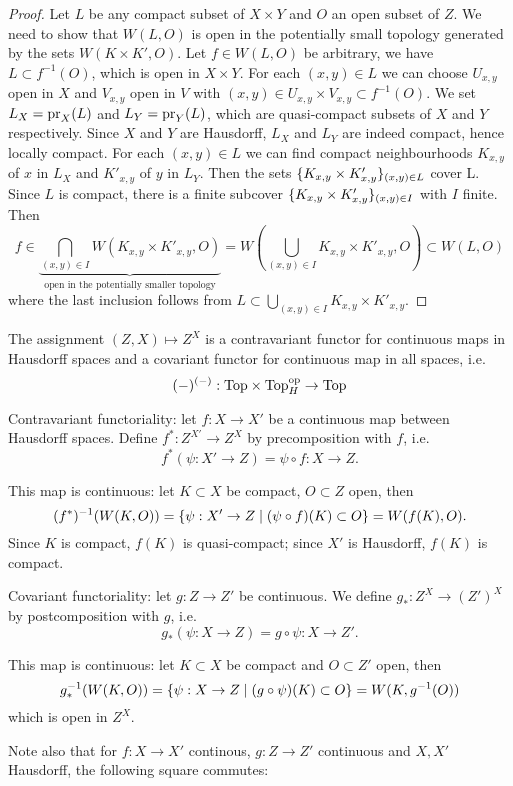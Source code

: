 \begin{proof}
Let $L$ be any compact subset of $X\times Y$ and $O$ an open subset of $Z$. We need to show that $W(L,O)$ is open in the potentially small topology generated by the sets $W(K\times K',O)$. Let $f\in W(L,O)$ be arbitrary, we have $L\subset f^{-1}(O)$, which is open in $X\times Y$. For each $(x,y)\in L$ we can choose $U_{x,y}$ open in $X$ and $V_{x,y}$ open in $V$ with $(x,y)\in U_{x,y}\times V_{x,y}\subset f^{-1}(O)$. We set $L_X=\operatorname{pr}_X(L)$ and $L_Y=\operatorname{pr}_Y(L)$, which are quasi-compact subsets of $X$ and $Y$ respectively. Since $X$ and $Y$ are Hausdorff, $L_X$ and $L_Y$ are indeed compact, hence locally compact. For each $(x,y)\in L$ we can find compact neighbourhoods $K_{x,y}$ of $x$ in $L_X$ and $K'_{x,y}$ of $y$ in $L_Y$. Then the sets $\{K_{x,y}\times K'_{x,y}\}_{(x,y)\in L}$ cover L. Since $L$ is compact, there is a finite subcover $\{K_{x,y}\times K'_{x,y}\}_{(x,y)\in I}$ with $I$ finite. Then
\[f\in\underbrace{\bigcap_{(x,y)\in I}W(K_{x,y}\times K'_{x,y},O)}_{\text{open in the potentially smaller topology}}=W(\bigcup_{(x,y)\in I}K_{x,y}\times K'_{x,y},O)\subset W(L,O)\]
where the last inclusion follows from $L\subset \bigcup_{(x,y)\in I}K_{x,y}\times K'_{x,y}$.
\end{proof}

\begin{remark}
The assignment $(Z,X)\mapsto Z^X$ is a contravariant functor for continuous maps in Hausdorff spaces and a covariant functor for continuous map in all spaces, i.e.
\[(-)^{(-)}:{\mathrm{Top}}\times{\mathrm{Top}}^{\operatorname{op}}_{H}\to {\mathrm{Top}}\]

Contravariant functoriality: let $f:X\to X'$ be a continuous map between Hausdorff spaces. Define $f^*:Z^{X'}\to Z^X$ by precomposition with $f$, i.e.
\[f^*(\psi:X'\to Z)=\psi\circ f:X\to Z.\]

This map is continuous: let $K\subset X$ be compact, $O\subset Z$ open, then
\[(f^*)^{-1}(W(K,O))=\{\psi:X'\to Z\mid (\psi\circ f)(K)\subset O\}=W(f(K),O).\]
Since $K$ is compact, $f(K)$ is quasi-compact; since $X'$ is Hausdorff, $f(K)$ is compact.

Covariant functoriality: let $g:Z\to Z'$ be continuous. We define $g_*:Z^X\to (Z')^X$ by postcomposition with $g$, i.e.
\[g_*(\psi:X\to Z)=g\circ\psi:X\to Z'.\]

This map is continuous: let $K\subset X$ be compact and $O\subset Z'$ open, then
\[g_*^{-1}(W(K,O))=\{\psi:X\to Z\mid (g\circ\psi)(K)\subset O\}=W(K,g^{-1}(O))\]
which is open in $Z^X$.

Note also that for $f:X\to X'$ continous, $g:Z\to Z'$ continuous and $X,X'$ Hausdorff, the following square commutes:
\begin{center}
\end{center}
\end{remark}

